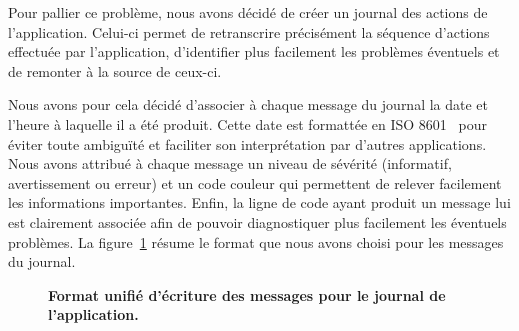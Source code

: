 Pour pallier ce problème, nous avons décidé de créer un journal des actions de l'application. Celui-ci permet de retranscrire précisément la séquence d'actions effectuée par l'application, d'identifier plus facilement les problèmes éventuels et de remonter à la source de ceux-ci.

Nous avons pour cela décidé d'associer à chaque message du journal la date et l'heure à laquelle il a été produit. Cette date est formattée en ISO 8601~\parencite{iso8601} pour éviter toute ambiguïté et faciliter son interprétation par d'autres applications. Nous avons attribué à chaque message un niveau de sévérité (informatif, avertissement ou erreur) et un code couleur qui permettent de relever facilement les informations importantes. Enfin, la ligne de code ayant produit un message lui est clairement associée afin de pouvoir diagnostiquer plus facilement les éventuels problèmes. La figure~\ref{fig:conception-journal} résume le format que nous avons choisi pour les messages du journal.

\begin{figure}[h!]
    \centering

    \caption{\textbf{Format unifié d'écriture des messages pour le journal de l'application.}}
    \label{fig:conception-journal}
\end{figure}
